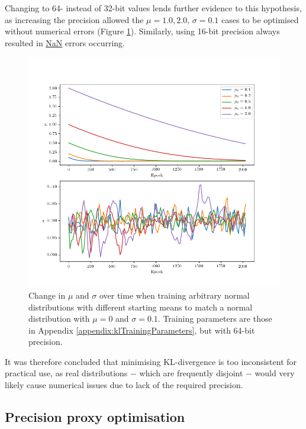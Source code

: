 \documentclass[../../main.tex]{subfiles}
\begin{document}
Changing to 64- instead of 32-bit values lends further evidence to this hypothesis, as increasing the precision allowed the $\mu=1.0,2.0$, $\sigma=0.1$ cases to be optimised without numerical errors (Figure \ref{fig:narrowKLDivergenceFloat64}).
Similarly, using 16-bit precision always resulted in \url{NaN} errors occurring.
\begin{figure}[H]
    \begin{center}
    \includegraphics[width=\textwidth]{narrowKLDivergenceFloat64}
    \caption{
        Change in $\mu$ and $\sigma$ over time when training arbitrary normal distributions with different starting means to match a normal distribution with $\mu=0$ and $\sigma=0.1$. 
        Training parameters are those in Appendix \ref{appendix:klTrainingParameters}, but with 64-bit precision.
    }
    \label{fig:narrowKLDivergenceFloat64}
    \end{center}
\end{figure}
It was therefore concluded that minimising KL-divergence is too inconsistent for practical use, as real distributions $-$ which are frequently disjoint $-$ would very likely cause numerical issues due to lack of the required precision.

\subsection{Precision proxy optimisation} \label{subsection:precisionProxyOptimisation}
\end{document}
